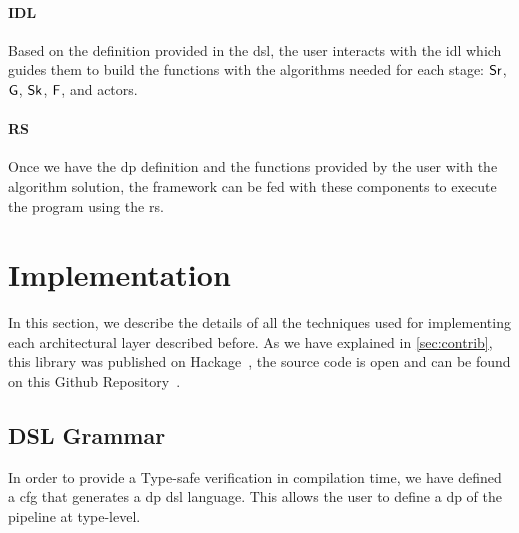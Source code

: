 \paragraph{IDL} Based on the definition provided in the \acrshort{dsl}, the user interacts with the \acrshort{idl} which guides them to build the functions with the algorithms needed for each stage: $\mathsf{Sr}$, $\mathsf{G}$, $\mathsf{Sk}$, $\mathsf{F}$, and actors. 

\paragraph{RS} Once we have the \acrshort{dp} definition and the functions provided by the user with the algorithm solution, the framework
can be fed with these components to execute the program using the \acrshort{rs}. 

\section{Implementation}
In this section, we describe the details of all the techniques used for implementing each architectural layer described before.
As we have explained in \autoref{sec:contrib}, this library was published on Hackage~\cite{dynamic-pipeline}, the source code is open and can be found on this Github Repository~\cite{dynamic-pipeline-git}.

\subsection{DSL Grammar}\label{sub:sec:dsl-gram}
In order to provide a Type-safe verification in compilation time, we have defined a \acrfull{cfg} that generates a \acrshort{dp} \acrshort{dsl} language. 
This allows the user to define a \acrshort{dp} of the pipeline at type-level. 

